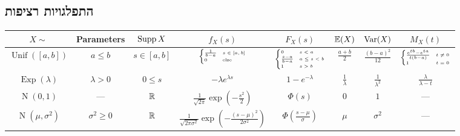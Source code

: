 \subsection{התפלגויות רציפות}
\begin{otherlanguage}{english}
	\begin{center}
		\begin{tabular}{c | c c c c c c c} %
			$X \sim$ & Parameters & $\operatorname{Supp} X$ & $f_X(s)$ & $F_X(s)$ & $\mathbb{E}(X)$ & $\operatorname{Var}(X)$ & $M_X(t)$ \\
			\hline %
			$\operatorname{Unif}([a, b])$ & $a \le b$ & $s \in [a, b]$ & $\tiny\begin{cases} \frac{1}{b - a} & s \in [a, b] \\ 0 & \text{else} \end{cases}$ & $\tiny\begin{cases} 0
						   & s < a \\ \frac{s - a}{b - a} & a \le s < b \\ 1 & s > b \end{cases}$
						   & $\frac{a + b}{2}$ & $\frac{{(b - a)}^2}{12}$ & $\tiny\begin{cases} \frac{e^{tb} - e^{ta}}{t(b - a)} & t \ne 0 \\ 1 & t = 0 \end{cases}$ \\
			\hline %
			$\operatorname{Exp}(\lambda)$ & $\lambda > 0$ & $0 \le s$ & $-\lambda e^{\lambda s}$ & $1 - e^{-\lambda}$ & $\frac{1}{\lambda}$ & $\frac{1}{\lambda^2}$ & $\frac{\lambda}{\lambda - t}$ \\
			\hline %
			$\operatorname{N}(0, 1)$ & --- & $\mathbb{R}$ & $\frac{1}{\sqrt{2 \pi}} \exp(-\frac{s^2}{2})$ & $\Phi(s)$ & $0$ & $1$ & --- \\
			\hline %
			$\operatorname{N}(\mu, \sigma^2)$ & $\sigma^2 \ge 0$ & $\mathbb{R}$ & $\frac{1}{\sqrt{2 \pi \sigma^2}} \exp(-\frac{{(s - \mu)}^2}{2 \sigma^2})$ & $\Phi(\frac{s - \mu}{\sigma})$ & $\mu$ & $\sigma^2$ & ---
		\end{tabular}
	\end{center}
\end{otherlanguage}

\listoftheorems[title=הגדרות ומשפטים,ignoreall,show={theorem,definition},swapnumber,onlynamed={proposition}]


